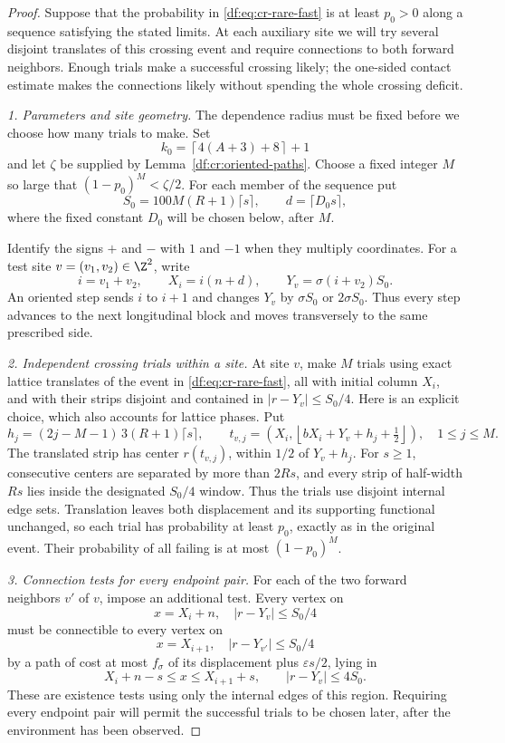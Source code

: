 \begin{proof}
Suppose that the probability in \eqref{df:eq:cr-rare-fast} is at least
$p_0>0$ along a sequence satisfying the stated limits. At each auxiliary
site we will try several disjoint translates of this crossing event and
require connections to both forward neighbors. Enough trials make a
successful crossing likely; the one-sided contact estimate makes the
connections likely without spending the whole crossing deficit.

\emph{1. Parameters and site geometry.}
The dependence radius must be fixed before we choose how many trials to
make. Set
\[
 k_0=\left\lceil4(A+3)+8\right\rceil+1
\]
and let $\zeta$ be supplied by Lemma~\ref{df:cr:oriented-paths}. Choose a
fixed integer $M$ so large that $(1-p_0)^M<\zeta/2$. For each member of
the sequence put
\[
 S_0=100M(R+1)\lceil s\rceil,
 \qquad d=\lceil D_0s\rceil,
\]
where the fixed constant $D_0$ will be chosen below, after $M$.

Identify the signs $+$ and $-$ with $1$ and $-1$ when they multiply
coordinates. For a test site $v=(v_1,v_2)\in\Z^2$, write
\[
 i=v_1+v_2,
 \qquad X_i=i(n+d),
 \qquad Y_v=\sigma(i+v_2)S_0.
\]
An oriented step sends $i$ to $i+1$ and changes $Y_v$ by $\sigma S_0$
or $2\sigma S_0$. Thus every step advances to the next longitudinal
block and moves transversely to the same prescribed side.

\emph{2. Independent crossing trials within a site.}
At site $v$, make $M$ trials using exact lattice translates of the event
in \eqref{df:eq:cr-rare-fast}, all with initial column $X_i$, and with their
strips disjoint and contained in $|r-Y_v|\le S_0/4$. Here is an explicit
choice, which also accounts for lattice phases. Put
\[
 h_j=(2j-M-1)\,3(R+1)\lceil s\rceil,
 \qquad
 t_{v,j}=\left(X_i,
    \left\lfloor bX_i+Y_v+h_j+\tfrac12\right\rfloor\right),
 \quad 1\le j\le M.
\]
The translated strip has center $r(t_{v,j})$, within $1/2$ of
$Y_v+h_j$. For $s\ge1$, consecutive centers are separated by more than
$2Rs$, and every strip of half-width $Rs$ lies inside the designated
$S_0/4$ window. Thus the trials use disjoint internal edge sets.
Translation leaves both displacement and its supporting functional
unchanged, so each trial has probability at least $p_0$, exactly as in
the original event. Their probability of all failing is at most
$(1-p_0)^M$.

\emph{3. Connection tests for every endpoint pair.}
For each of the two forward neighbors $v'$ of $v$, impose an additional
test. Every vertex on
\[
 x=X_i+n,\quad |r-Y_v|\le S_0/4
\]
must be connectible to every vertex on
\[
 x=X_{i+1},\quad |r-Y_{v'}|\le S_0/4
\]
by a path of cost at most $f_\sigma$ of its displacement plus
$\varepsilon s/2$, lying in
\begin{equation}\label{df:eq:cr-connector-region}
 X_i+n-s\le x\le X_{i+1}+s,
 \qquad |r-Y_v|\le4S_0.
\end{equation}
These are existence tests using only the internal edges of this region.
Requiring every endpoint pair will permit the successful trials to be
chosen later, after the environment has been observed.


\end{proof}
